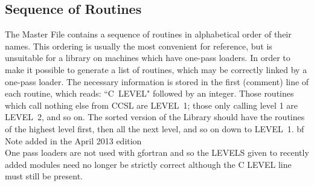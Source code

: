 \subsection{Sequence of Routines}
The Master File contains a sequence of routines in alphabetical order of
their names.  This ordering is usually the most convenient for reference,
but is unsuitable for a library on machines which have
one-pass loaders. 
In order to make it possible  to generate a  list of routines,
which may be correctly linked by a one-pass loader. The necessary 
information is stored in the first (comment) line of each routine, which reads:
``C~LEVEL" followed by an integer.  Those routines which call nothing else from
CCSL are LEVEL~1;  those only calling level 1 are LEVEL~2, and so on.
The sorted version of the Library should have the routines of the highest
level first, then all the next level, and so on down to LEVEL~1.
\p
{bf Note} added in the April 2013 edition\\
One pass loaders are not used with gfortran and so the LEVELS given to recently
added modules need no longer be strictly correct although the C LEVEL line
must still be present.
\p 
